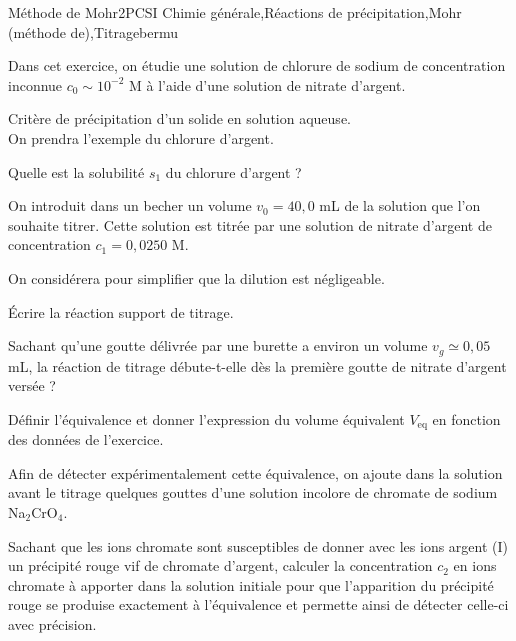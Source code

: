 
\begin{exercise}{Méthode de Mohr}{2}{PCSI}
{Chimie générale,Réactions de précipitation,Mohr (méthode de),Titrage}{bermu}

Dans cet exercice, on étudie une solution de chlorure de sodium de concentration inconnue $c_0 \sim 10^{-2}$ M à l'aide d'une solution de nitrate d'argent.

\begin{questions}
\questioncours Critère de précipitation d'un solide en solution aqueuse. \\ On prendra l'exemple du chlorure d'argent.

\question Quelle est la solubilité $s_1$ du chlorure d'argent ?

\begin{EnvUplevel}
    On introduit dans un becher un volume $v_0 = 40,0$ mL de la solution que l'on souhaite titrer. Cette solution est titrée par une solution de nitrate d’argent de concentration $c_1 = 0,0250$ M.
    
    On considérera pour simplifier que la dilution est négligeable.
\end{EnvUplevel}

\question \'Ecrire la réaction support de titrage.

\question Sachant qu'une goutte délivrée par une burette a environ un volume $v_g \simeq 0,05$ mL, la réaction de titrage débute-t-elle dès la première goutte de nitrate d’argent versée ?

\question Définir l'équivalence et donner l'expression du volume équivalent $V_\text{eq}$ en fonction des données de l'exercice.

\begin{EnvUplevel}
    Afin de détecter expérimentalement cette équivalence, on ajoute dans la solution avant le titrage quelques gouttes d'une solution incolore de chromate de sodium Na$_2$CrO$_4$.
\end{EnvUplevel}

\question Sachant que les ions chromate sont susceptibles de donner avec les ions argent (I) un précipité rouge vif de chromate d’argent, calculer la concentration $c_2$ en ions chromate à apporter dans la solution initiale pour que l’apparition du précipité rouge se produise exactement à l’équivalence et permette ainsi de détecter celle-ci avec précision.


\end{questions}
\end{exercise}
